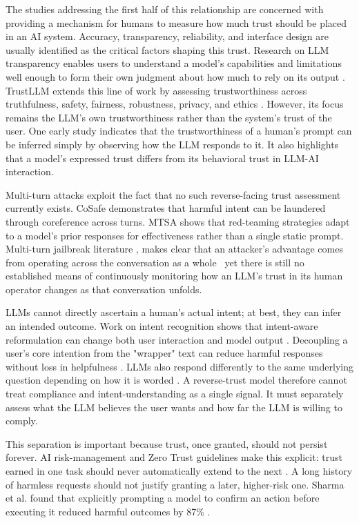 \documentclass[conference]{IEEEtran}
\begin{document}
The studies addressing the first half of this relationship \cite{ref1, ref2, ref3} are concerned with providing a mechanism for humans to measure how much trust should be placed in an AI system. Accuracy, transparency, reliability, and interface design are usually identified as the critical factors shaping this trust. Research on LLM transparency enables users to understand a model's capabilities and limitations well enough to form their own judgment about how much to rely on its output \cite{ref4}. TrustLLM extends this line of work by assessing trustworthiness across truthfulness, safety, fairness, robustness, privacy, and ethics \cite{ref5}. However, its focus remains the LLM's own trustworthiness rather than the system's trust of the user. 
One early study \cite{ref6} indicates that the trustworthiness of a human's prompt can be inferred simply by observing how the LLM responds to it. It also highlights that a model's expressed trust differs from its behavioral trust in LLM-AI interaction. 

Multi-turn attacks exploit the fact that no such reverse-facing trust assessment currently exists. CoSafe \cite{ref7} demonstrates that harmful intent can be laundered through coreference across turns. MTSA \cite{ref8} shows that red-teaming strategies adapt to a model's prior responses for effectiveness rather than a single static prompt. Multi-turn jailbreak literature \cite{ref9, ref10, ref11}, makes clear that an attacker's advantage comes from operating across the conversation as a whole \textemdash \ yet there is still no established means of continuously monitoring how an LLM's trust in its human operator changes as that conversation unfolds.

LLMs cannot directly ascertain a human's actual intent; at best, they can infer an intended outcome. Work on intent recognition shows that intent-aware reformulation can change both user interaction and model output \cite{ref12}. Decoupling a user's core intention from the "wrapper" text can reduce harmful responses without loss in helpfulness \cite{ref13}. LLMs also respond differently to the same underlying question depending on how it is worded \cite{ref14}. A reverse-trust model therefore cannot treat compliance and intent-understanding as a single signal. It must separately assess what the LLM believes the user wants and how far the LLM is willing to comply.

This separation is important because trust, once granted, should not persist forever. AI risk-management and Zero Trust guidelines make this explicit: trust earned in one task should never automatically extend to the next \cite{ref15, ref16}. A long history of harmless requests should not justify granting a later, higher-risk one. Sharma et al. found that explicitly prompting a model to confirm an action before executing it reduced harmful outcomes by 87\% \cite{ref17}.  
\end{document}
